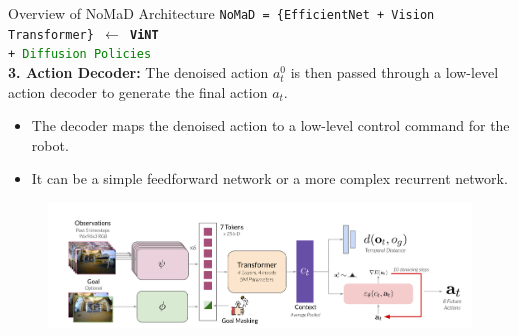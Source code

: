\documentclass{beamer}
\begin{document}
\begin{frame}{Overview of NoMaD Architecture}
    \texttt{NoMaD = \{EfficientNet + Vision Transformer\} $\leftarrow$ \textbf{ViNT} \\+ \textcolor{green}{Diffusion Policies}}\\
    \textbf{3. Action Decoder:} The denoised action $a^{0}_t$ is then passed through a low-level action decoder to generate the final action $a_t$.
    \begin{itemize}
        \item The decoder maps the denoised action to a low-level control command for the robot.
        \item It can be a simple feedforward network or a more complex recurrent network.
    \end{itemize}
    \begin{figure}
        \centering
        \includegraphics[width=1.01\linewidth]{nomad_diagram.png}
    \end{figure}
\end{frame}
\end{document}
